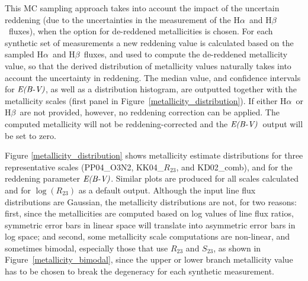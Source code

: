 \documentclass{emulateapj}
\newcommand{\ha}{\ensuremath{\mathrm{H}\alpha}}
\newcommand{\hb}{\ensuremath{\mathrm{H}\beta}}
\newcommand{\ebmv}{\ensuremath{\mathrm{\emph{E(B-V)}}}}
\begin{document}
This MC sampling approach takes into account the impact of the uncertain reddening (due to the uncertainties in the measurement of the 
\ha~and \hb~fluxes), when the option for de-reddened metallicities is chosen. For each synthetic set of measurements a new reddening value is calculated based on the sampled \ha~and \hb~fluxes, and used to compute the de-reddened metallicity value, so that the derived distribution of metallicity values naturally takes into account the uncertainty in reddening. The median value, and confidence intervals for \ebmv, as well as a distribution histogram, are outputted together with the metallicity scales (first panel in Figure~\ref{metallicity_distribution}). If either \ha~or \hb~are not provided, however, no reddening correction can be applied. The computed metallicity will not be reddening-corrected and the \ebmv~output will be set to zero.

Figure \ref{metallicity_distribution} shows metallicity estimate distributions for three representative scales (PP04\_O3N2, KK04\_$R_{23}$, and KD02\_comb), and for the reddening parameter \ebmv. Similar plots are produced for all scales calculated and for $\log(R_{23})$ as a default output. Although the input line flux distributions are Gaussian, the metallicity distributions are not, for two reasons: first, since the metallicities are computed based on log values of line flux ratios, symmetric error bars in linear space will translate into asymmetric error bars in log space; and second, some metallicity scale computations are non-linear, and sometimes bimodal, especially those that use $R_{23}$ and $S_{23}$, as shown in Figure~\ref{metallicity_bimodal}, since the upper or lower branch metallicity value has to be chosen to break the degeneracy for each synthetic measurement.
\end{document}

